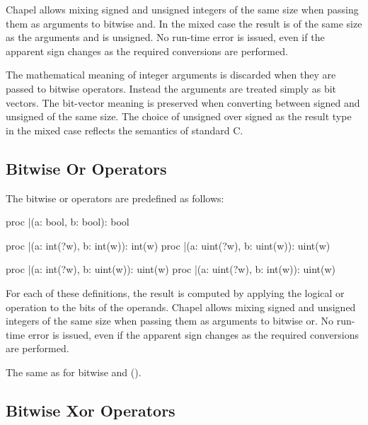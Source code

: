 Chapel allows mixing signed and unsigned integers of the same size
when passing them as arguments to bitwise and.
In the mixed case the result is of the same size as the arguments
and is unsigned.
No run-time error is issued, even if the apparent sign changes as the
required conversions are performed.

\begin{rationale}
The mathematical meaning of integer arguments
is discarded when they are passed to bitwise operators.
Instead the arguments are treated simply as bit vectors.
The bit-vector meaning is preserved when converting
between signed and unsigned of the same size.
The choice of unsigned over signed as the result type in the mixed case
reflects the semantics of standard C.
\end{rationale}

\subsection{Bitwise Or Operators}
\label{Bitwise_Or_Operators}

The bitwise or operators are predefined as follows:
\begin{chapel}
proc |(a: bool, b: bool): bool

proc |(a: int(?w), b: int(w)): int(w)
proc |(a: uint(?w), b: uint(w)): uint(w)

proc |(a: int(?w), b: uint(w)): uint(w)
proc |(a: uint(?w), b: int(w)): uint(w)
\end{chapel}

For each of these definitions, the result is
computed by applying the logical or operation to the bits of the
operands.
Chapel allows mixing signed and unsigned integers of the same size
when passing them as arguments to bitwise or.
No run-time error is issued, even if the apparent sign changes as the
required conversions are performed.

\begin{rationale}
The same as for bitwise and ().
\end{rationale}

\subsection{Bitwise Xor Operators}
\label{Bitwise_Xor_Operators}

